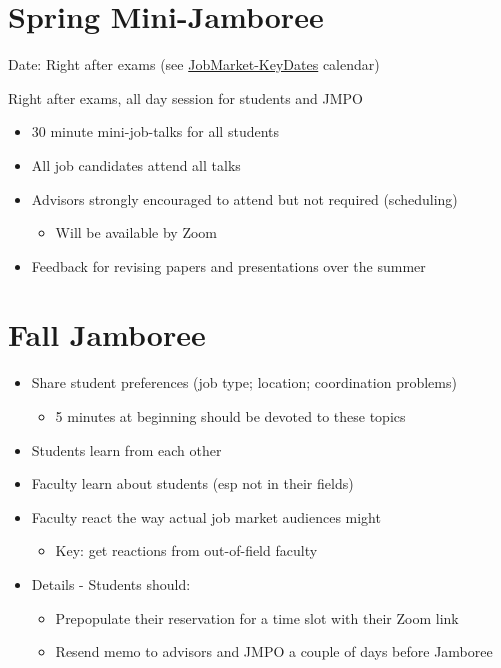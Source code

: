 \documentclass{scrartcl}
\begin{document}
\medskip


\hypertarget{jamboree-mini-spring}{}
\section*{Spring Mini-Jamboree}

Date: Right after exams (see \href{https://calendar.google.com/calendar/u/0?cid=amh1ZWNvbi5vcmdfYnUyM2xoNXA2a2IwbjMzYmprdWI0am5pa3NAZ3JvdXAuY2FsZW5kYXIuZ29vZ2xlLmNvbQ}{JobMarket-KeyDates} calendar)

Right after exams, all day session for students and JMPO
\begin{itemize}
  
\item 30 minute mini-job-talks for all students
\item All job candidates attend all talks
\item Advisors strongly encouraged to attend but not required (scheduling)
  \begin{itemize}
  \item Will be available by Zoom
  \end{itemize}
\item Feedback for revising papers and presentations over the summer
\end{itemize}

\hypertarget{jamboree-maxi-fall}{}
\section*{Fall Jamboree}

\begin{itemize}
\item Share student preferences (job type; location; coordination problems)
  \begin{itemize}
  \item 5 minutes at beginning should be devoted to these topics
  \end{itemize}
\item Students learn from each other
\item Faculty learn about students (esp not in their fields)
\item Faculty react the way actual job market audiences might
  \begin{itemize}
  \item Key: get reactions from out-of-field faculty
  \end{itemize}

\item{Details - Students should:}
  \begin{itemize}
  \item Prepopulate their reservation for a time slot with their Zoom link
    \item Resend memo to advisors and JMPO a couple of days before Jamboree 
  \end{itemize}
\end{itemize}
\end{document}
